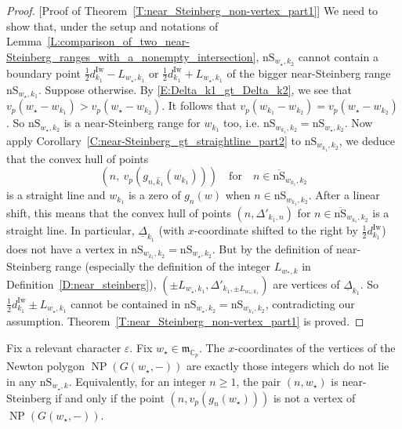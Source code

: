 \begin{proof}
    [Proof of Theorem~\ref{T:near_Steinberg_non-vertex_part1}]
    We need to show that, under the setup and notations of Lemma~\ref{L:comparison_of_two_near-Steinberg_ranges_with_a_nonempty_intersection}, ${\mathrm{nS}}_{w_\star, k_2}$ cannot contain a boundary point $\frac 12 d_{k_1}^{\mathrm{Iw}}- L_{w_\star, k_1}$ or $\frac 12 d_{k_1}^{\mathrm{Iw}}+ L_{w_\star, k_1}$ of the bigger near-Steinberg range ${\mathrm{nS}}_{w_\star, k_1}$. Suppose otherwise. By \eqref{E:Delta_k1_gt_Delta_k2}, we see that $v_p(w_\star - w_{k_1}) > v_p(w_{\star} - w_{k_2})$. It follows that $v_p(w_{k_1} - w_{k_2}) = v_p(w_\star - w_{k_2})$. So ${\mathrm{nS}}_{w_\star, k_2}$ is a near-Steinberg range for $w_{k_1}$ too, i.e. ${\mathrm{nS}}_{w_{k_1}, k_2} = {\mathrm{nS}}_{w_\star, k_2}$.  Now apply Corollary~\ref{C:near-Steinberg_gt_straightline_part2} to ${\mathrm{nS}}_{w_{k_1}, k_2}$, we deduce that
    the convex hull of points $$(n, \ v_p(g_{n,\hat k_1}(w_{k_1}))) \quad \textrm{for} \quad n \in \overline {\mathrm{nS}}_{w_{k_1}, k_2}
    $$
    is a straight line and $w_{k_1}$ is a zero of $g_n(w)$ when $n \in  {\mathrm{nS}}_{w_{k_1}, k_2}$. After a linear shift, this means that the convex hull of points $(n,\Delta'_{k_1, n})$ for $n \in \overline {\mathrm{nS}}_{w_{k_1}, k_2}$ is a straight line. In particular, $\underline \Delta_{k_1}$ (with $x$-coordinate shifted to the right by $\frac 12d_{k_1}^{\mathrm{Iw}}$) does not have a vertex in ${\mathrm{nS}}_{w_{k_1}, k_2} = {\mathrm{nS}}_{w_\star, k_2}$.
    But by the definition of near-Steinberg range (especially the definition of the integer $L_{w_\ast,k}$ in Definition~\ref{D:near_steinberg}), $(\pm L_{w_\star, k_1}, \Delta'_{k_1, \pm L_{w_\star, k_1}})$ are vertices of $\underline \Delta_{k_1}$.
    So $\frac 12d_{k_1}^{\mathrm{Iw}}\pm L_{w_\star, k_1}$ cannot be contained in  ${\mathrm{nS}}_{w_\star, k_2} = {\mathrm{nS}}_{w_{k_1}, k_2}$, contradicting our assumption. Theorem~\ref{T:near_Steinberg_non-vertex_part1} is proved.
\end{proof}

\begin{theorem}
    \label{T:near_Steinberg_non-vertex_part2}
    Fix a relevant character $\varepsilon$.
    Fix $w_\star \in {\mathfrak{m}}_{{\mathbb{C}}_p}$.
    The $x$-coordinates of the vertices of the Newton polygon ${\operatorname{NP}}(G(w_\star, -))$ are exactly those integers which do not lie in any ${\mathrm{nS}}_{w_\star, k}$. Equivalently, for an integer $n \geq 1$, the pair $(n, w_\star)$ is near-Steinberg if and only if the point $(n, v_p(g_n(w_\star)))$ is not a vertex of ${\operatorname{NP}}(G(w_\star, -))$.
\end{theorem}

